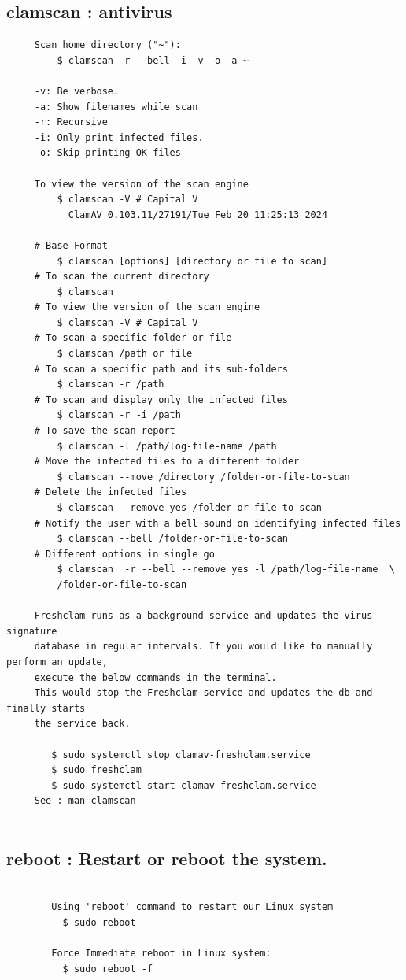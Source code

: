 \documentclass[a4paper,12pt]{article}
\begin{document}
\subsection{clamscan : antivirus }
\begin{verbatim}
     Scan home directory ("~"):
         $ clamscan -r --bell -i -v -o -a ~
     
     -v: Be verbose.
     -a: Show filenames while scan
     -r: Recursive
     -i: Only print infected files.
     -o: Skip printing OK files

     To view the version of the scan engine
         $ clamscan -V # Capital V
           ClamAV 0.103.11/27191/Tue Feb 20 11:25:13 2024
     
     # Base Format
         $ clamscan [options] [directory or file to scan]
     # To scan the current directory  
         $ clamscan 
     # To view the version of the scan engine
         $ clamscan -V # Capital V
     # To scan a specific folder or file
         $ clamscan /path or file
     # To scan a specific path and its sub-folders
         $ clamscan -r /path
     # To scan and display only the infected files
         $ clamscan -r -i /path
     # To save the scan report
         $ clamscan -l /path/log-file-name /path
     # Move the infected files to a different folder
         $ clamscan --move /directory /folder-or-file-to-scan
     # Delete the infected files
         $ clamscan --remove yes /folder-or-file-to-scan
     # Notify the user with a bell sound on identifying infected files
         $ clamscan --bell /folder-or-file-to-scan
     # Different options in single go
         $ clamscan  -r --bell --remove yes -l /path/log-file-name  \
         /folder-or-file-to-scan 

     Freshclam runs as a background service and updates the virus signature
     database in regular intervals. If you would like to manually perform an update,
     execute the below commands in the terminal. 
     This would stop the Freshclam service and updates the db and finally starts
     the service back.

        $ sudo systemctl stop clamav-freshclam.service
        $ sudo freshclam
        $ sudo systemctl start clamav-freshclam.service
     See : man clamscan 
     
\end{verbatim}


\subsection{reboot : Restart or reboot the system.}
\begin{verbatim}

        Using 'reboot' command to restart our Linux system
          $ sudo reboot

        Force Immediate reboot in Linux system:
          $ sudo reboot -f

\end{verbatim}
\end{document}
